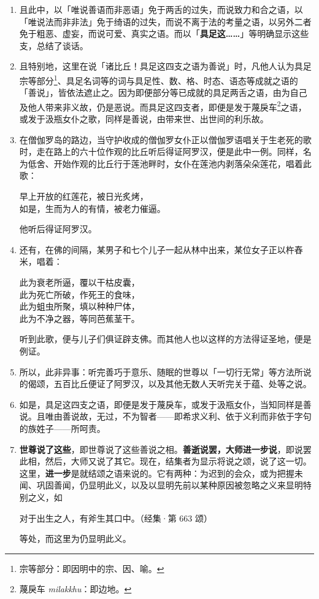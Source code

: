 \begin{enumerate}
\item 且此中，以「唯说善语而非恶语」免于两舌的过失，而说致力和合之语，以「唯说法而非非法」免于绮语的过失，而说不离于法的考量之语，以另外二者免于粗恶、虚妄，而说可爱、真实之语。而以「\textbf{具足这……}」等明确显示这些支，总结了谈话。
\item 且特别地，这里在说「诸比丘！具足这四支之语为善说」时，凡他人认为具足宗等部分\footnote{宗等部分：即因明中的宗、因、喻。}、具足名词等的词与具足性、数、格、时态、语态等成就之语的「善说」，皆依法遮止之。因为即便部分等已成就的具足两舌之语，由为自己及他人带来非义故，仍是恶说。而具足这四支者，即便是发于蔑戾车\footnote{蔑戾车 \textit{milakkhu}：即边地。}之语，或发于汲瓶女仆之歌，同样是善说，由带来世、出世间的利乐故。
\item 在僧伽罗岛的路边，当守护收成的僧伽罗女仆正以僧伽罗语唱关于生老死的歌时，走在路上的六十位作观的比丘听后得证阿罗汉，便是此中一例。同样，名为低舍、开始作观的比丘行于莲池畔时，女仆在莲池内剥落朵朵莲花，唱着此歌：\begin{quoting}早上开放的红莲花，被日光炙烤，\\如是，生而为人的有情，被老力催逼。\end{quoting}他听后得证阿罗汉。
\item 还有，在佛的间隔，某男子和七个儿子一起从林中出来，某位女子正以杵舂米，唱着：\begin{quoting}此为衰老所逼，覆以干枯皮囊，\\此为死亡所破，作死王的食味，\\此为蛆虫所聚，填以种种尸体，\\此为不净之器，等同芭蕉茎干。\end{quoting}听到此歌，便与儿子们俱证辟支佛。而其他人也以这样的方法得证圣地，便是例证。
\item 所以，此非异事：听完善巧于意乐、随眠的世尊以「一切行无常」等方法所说的偈颂，五百比丘便证了阿罗汉，以及其他无数人天听完关于蕴、处等之说。
\item 如是，具足这四支之语，即便是发于蔑戾车，或发于汲瓶女仆，当知同样是善说。且唯由善说故，无过，不为智者——即希求义利、依于义利而非依于字句的族姓子——所呵责。
\item \textbf{世尊说了这些}，即世尊说了这些善说之相。\textbf{善逝说罢，大师进一步说}，即说罢此相，然后，大师又说了其它。现在，结集者为显示将说之颂，说了这一切。这里，\textbf{进一步}是就结颂之语来说的。它有两种：为迟到的会众，或为把握未闻、巩固善闻，仍显明此义，以及以显明先前以某种原因被忽略之义来显明特别之义，如\begin{quoting}对于出生之人，有斧生其口中。（经集·第 663 颂）\end{quoting}等处，而这里为仍显明此义。\end{enumerate}

